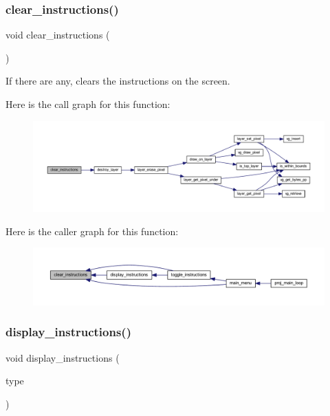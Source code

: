 \subsubsection{\texorpdfstring{clear\+\_\+instructions()}{clear\_instructions()}}
{\footnotesize\ttfamily void clear\+\_\+instructions (\begin{DoxyParamCaption}{ }\end{DoxyParamCaption})}



If there are any, clears the instructions on the screen. 

Here is the call graph for this function\+:\nopagebreak
\begin{figure}[H]
\begin{center}
\leavevmode
\includegraphics[width=350pt]{group__game__info_gaab96e5ba2a7e443add23ff59fb5f43c9_cgraph}
\end{center}
\end{figure}
Here is the caller graph for this function\+:\nopagebreak
\begin{figure}[H]
\begin{center}
\leavevmode
\includegraphics[width=350pt]{group__game__info_gaab96e5ba2a7e443add23ff59fb5f43c9_icgraph}
\end{center}
\end{figure}
\mbox{\label{group__game__info_ga6b00da117e65804d334e303e48a33a49}} 
\subsubsection{\texorpdfstring{display\+\_\+instructions()}{display\_instructions()}}
{\footnotesize\ttfamily void display\+\_\+instructions (\begin{DoxyParamCaption}\item[{\mbox{\hyperlink{group__game__info_ga4fab2721054fd66cc89f138fd029fd1f}{Info\+Type}}}]{type }\end{DoxyParamCaption})}



